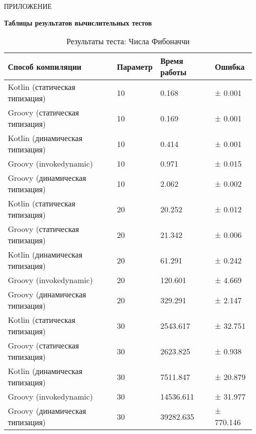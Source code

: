 \vfill
\clearpage
\appendix


    \hfill ПРИЛОЖЕНИЕ 
    \begin{center}
        \bf{Таблицы результатов вычислительных тестов}
    \end{center}
    \markboth{\MakeUppercase{}}{}
    
    \begin{table}[h]
\caption{\label{tab:fibBenchResults}Результаты теста: Числа Фибоначчи}
\begin{center}
\begin{tabular}{|l|l|l|l|}
\hline
Способ компиляции & Параметр & Время работы & Ошибка \\
\hline
Kotlin (статическая типизация)           & 10  &     0.168 & ±   0.001  \\
Groovy (статическая типизация)           & 10  &     0.169 & ±   0.001  \\
Kotlin (динамическая типизация)          & 10  &     0.414 & ±   0.001  \\
Groovy (invokedynamic)                   & 10  &     0.971 & ±   0.015  \\
Groovy (динамическая типизация)          & 10  &     2.062 & ±   0.002  \\
Kotlin (статическая типизация)           & 20  &    20.252 & ±   0.012  \\
Groovy (статическая типизация)           & 20  &    21.342 & ±   0.006  \\
Kotlin (динамическая типизация)          & 20  &    61.291 & ±   0.242  \\
Groovy (invokedynamic)                   & 20  &   120.601 & ±   4.669  \\
Groovy (динамическая типизация)          & 20  &   329.291 & ±   2.147  \\
Kotlin (статическая типизация)           & 30  &  2543.617 & ±  32.751  \\
Groovy (статическая типизация)           & 30  &  2623.825 & ±   0.938  \\
Kotlin (динамическая типизация)          & 30  &  7511.847 & ±  20.879  \\
Groovy (invokedynamic)                   & 30  & 14536.611 & ±  31.977  \\
Groovy (динамическая типизация)          & 30  & 39282.635 & ± 770.146  \\
\hline
\end{tabular}
\end{center}
\end{table} 
    
